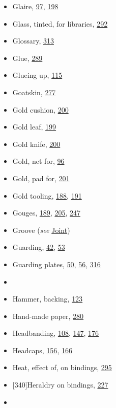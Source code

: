 \documentclass[
]{article}
\begin{document}
\begin{itemize}
\item
  Glaire, \protect\hyperlink{Page_97}{97},
  \protect\hyperlink{Page_198}{198}
\item
  Glass, tinted, for libraries, \protect\hyperlink{Page_292}{292}
\item
  Glossary, \protect\hyperlink{Page_313}{313}
\item
  Glue, \protect\hyperlink{Page_289}{289}
\item
  Glueing up, \protect\hyperlink{Page_115}{115}
\item
  Goatskin, \protect\hyperlink{Page_277}{277}
\item
  Gold cushion, \protect\hyperlink{Page_200}{200}
\item
  Gold leaf, \protect\hyperlink{Page_199}{199}
\item
  Gold knife, \protect\hyperlink{Page_200}{200}
\item
  Gold, net for, \protect\hyperlink{Page_96}{96}
\item
  Gold, pad for, \protect\hyperlink{Page_201}{201}
\item
  Gold tooling, \protect\hyperlink{Page_188}{188},
  \protect\hyperlink{Page_191}{191}
\item
  Gouges, \protect\hyperlink{Page_189}{189},
  \protect\hyperlink{Page_205}{205}, \protect\hyperlink{Page_247}{247}
\item
  Groove (\emph{see} \protect\hyperlink{Joint}{Joint})
\item
  Guarding, \protect\hyperlink{Page_42}{42},
  \protect\hyperlink{Page_53}{53}
\item
  Guarding plates, \protect\hyperlink{Page_50}{50},
  \protect\hyperlink{Page_56}{56}, \protect\hyperlink{Page_316}{316}
\item
  ~
\item
  {Hammer}, backing, \protect\hyperlink{Page_123}{123}
\item
  Hand-made paper, \protect\hyperlink{Page_280}{280}
\item
  Headbanding, \protect\hyperlink{Page_108}{108},
  \protect\hyperlink{Page_147}{147}, \protect\hyperlink{Page_176}{176}
\item
  Headcaps, \protect\hyperlink{Page_156}{156},
  \protect\hyperlink{Page_166}{166}
\item
  Heat, effect of, on bindings, \protect\hyperlink{Page_295}{295}
\item
  {\protect\hypertarget{Page_340}{}{{[}340{]}}}Heraldry on bindings,
  \protect\hyperlink{Page_227}{227}
\item

\end{itemize}
\end{document}

